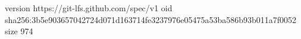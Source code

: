version https://git-lfs.github.com/spec/v1
oid sha256:3b5e903657042724d071d163714fe3237976e05475a53ba586b93b011a7f0052
size 974
